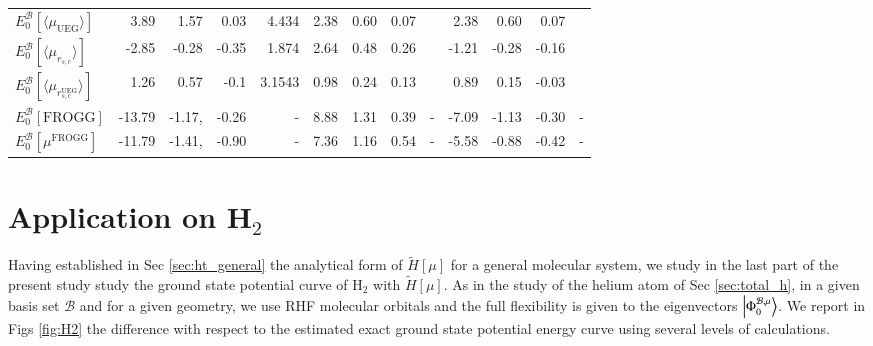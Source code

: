 \documentclass[aip,jcp,reprint,noshowkeys,superscriptaddress]{revtex4-1}
\newcommand{\frogg}[0]{\text{FROGG}}
\newcommand{\mfrogg}[0]{\mu^\text{FROGG}}
\newcommand{\phimub}[0]{\Phi^{\mathcal{B},\mu}_0}
\newcommand{\basis}[0]{\mathcal{B}}
\newcommand{\muuegav}{\langle \mu_{\text{UEG}}\rangle}
\newcommand{\murscav}{\langle \mu_{r_{s,c}}\rangle}
\newcommand{\mursclda}{\langle \mu_{r_{s,c}^{\text{UEG}}}\rangle}
\begin{document}
\begin{table}
\begin{ruledtabular}
\begin{tabular}{l|rrr|r||rrr|r||rrr|r|}
$E_0^{\basis}[\muuegav]$ &  3.89   &   1.57   &  0.03    &4.434      & 2.38    &    0.60  &    0.07 &          &   2.38   &   0.60   &    0.07&      \\   
$E_0^{\basis}[\murscav]$ &  -2.85  &  -0.28   & -0.35    &1.874      & 2.64    &    0.48  &    0.26 &          &  -1.21   &  -0.28   &   -0.16&      \\   
$E_0^{\basis}[\mursclda]$&  1.26   &   0.57   & -0.1     &3.1543     & 0.98    &    0.24  &    0.13 &          &   0.89   &   0.15   &   -0.03&      \\   
$E_0^{\basis}[\frogg]$   &  -13.79 &  -1.17,  & -0.26    &    -      & 8.88    &    1.31  &    0.39 &   -      & -7.09    &  -1.13   &   -0.30&    - \\
$E_0^{\basis}[\mfrogg]$  &  -11.79 &  -1.41,  & -0.90    &    -      & 7.36    &    1.16  &    0.54 &   -      & -5.58    &  -0.88   &   -0.42&    - \\
\end{tabular}
\end{ruledtabular}
\end{table}

\section{Application on H$_2$}
Having established in Sec \ref{sec:ht_general} the analytical form of $ \tilde{H}[\mu]$ for a general molecular system, we study in the last part of the present study study the ground state potential curve of H$_2$ with $ \tilde{H}[\mu]$. 
As in the study of the helium atom of Sec \ref{sec:total_h}, in a given basis set $\basis$ and for a given geometry, we use RHF molecular orbitals and the full flexibility is given to the eigenvectors $\ket{\phimub}$. 
We report in Figs \ref{fig:H2} the difference with respect to the estimated exact ground state potential energy curve using several levels of calculations. 
\end{document}
